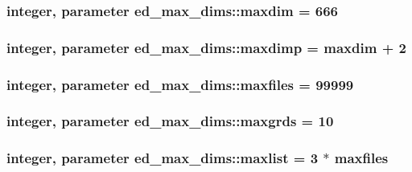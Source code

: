 \subsubsection[{\texorpdfstring{maxdim}{maxdim}}]{\setlength{\rightskip}{0pt plus 5cm}integer, parameter ed\+\_\+max\+\_\+dims\+::maxdim = 666}\hypertarget{namespaceed__max__dims_a9939d6b90ae112d873f844ddf07a6544}{}\label{namespaceed__max__dims_a9939d6b90ae112d873f844ddf07a6544}
\subsubsection[{\texorpdfstring{maxdimp}{maxdimp}}]{\setlength{\rightskip}{0pt plus 5cm}integer, parameter ed\+\_\+max\+\_\+dims\+::maxdimp = {\bf maxdim} + 2}\hypertarget{namespaceed__max__dims_a203a83a4c06e8a68f13e469a976083d4}{}\label{namespaceed__max__dims_a203a83a4c06e8a68f13e469a976083d4}
\subsubsection[{\texorpdfstring{maxfiles}{maxfiles}}]{\setlength{\rightskip}{0pt plus 5cm}integer, parameter ed\+\_\+max\+\_\+dims\+::maxfiles = 99999}\hypertarget{namespaceed__max__dims_a45e43025f8cc741156429739b0501e1e}{}\label{namespaceed__max__dims_a45e43025f8cc741156429739b0501e1e}
\subsubsection[{\texorpdfstring{maxgrds}{maxgrds}}]{\setlength{\rightskip}{0pt plus 5cm}integer, parameter ed\+\_\+max\+\_\+dims\+::maxgrds = 10}\hypertarget{namespaceed__max__dims_a76506f11ab040bb342f7eeeda2609717}{}\label{namespaceed__max__dims_a76506f11ab040bb342f7eeeda2609717}
\subsubsection[{\texorpdfstring{maxlist}{maxlist}}]{\setlength{\rightskip}{0pt plus 5cm}integer, parameter ed\+\_\+max\+\_\+dims\+::maxlist = 3 $\ast$ {\bf maxfiles}}\hypertarget{namespaceed__max__dims_a044088d546c2e93b93de0b814f696be7}{}\label{namespaceed__max__dims_a044088d546c2e93b93de0b814f696be7}
